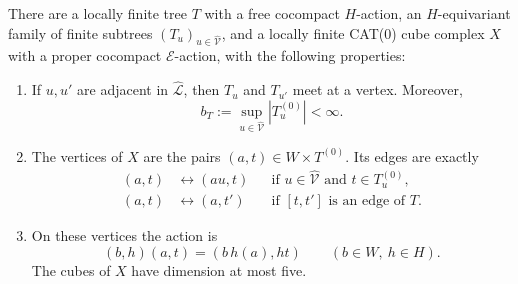 \begin{lemma}
\label{hyp:cubical-model}
There are a locally finite tree \(T\) with a free cocompact \(H\)-action,
an \(H\)-equivariant family of finite subtrees
\((T_u)_{u\in\widehat{\mathcal V}}\), and a locally finite CAT(0) cube
complex \(X\) with a proper cocompact \(\mathcal E\)-action, with the
following properties:
\begin{enumerate}
\item If \(u,u'\) are adjacent in \(\widehat{\mathcal L}\), then
      \(T_u\) and \(T_{u'}\) meet at a vertex.  Moreover,
      \[
      b_T:=\sup_{u\in\widehat{\mathcal V}}|T_u^{(0)}|<\infty.
      \]
\item The vertices of \(X\) are the pairs \((a,t)\in W\times T^{(0)}\).
      Its edges are exactly
      \begin{equation}
      \begin{aligned}
      (a,t)&\longleftrightarrow(au,t)
        &&\text{if }u\in\widehat{\mathcal V}\text{ and }t\in T_u^{(0)},\\
      (a,t)&\longleftrightarrow(a,t')
        &&\text{if }[t,t']\text{ is an edge of }T.
      \end{aligned}
      \label{hyp:edge-graph}
      \end{equation}
\item On these vertices the action is
      \[
      (b,h)(a,t)=(b\,h(a),ht)
      \qquad (b\in W,\ h\in H).
      \]
      The cubes of \(X\) have dimension at most five.
\end{enumerate}
\end{lemma}


